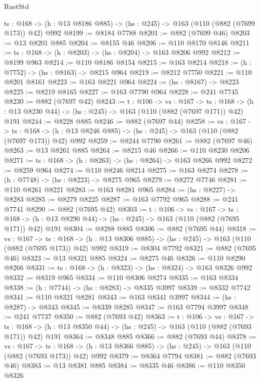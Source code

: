 \begin{lexlean}{RustStd}
\begin{coremodule}
  {ts : @168} -> (h : @13 @8186 @885) -> (hs : @245) -> @163 (@110 (@882 (@7699 @173)) @42) @992
@8199 := @8184 @7788
@8201 := @882 (@7699 @46)
@8203 := @13 @8201 @885
@8204 := @8155 @46
@8206 := @110 @8170 @8146
@8211 := {ts : @168} -> (h : @8203) -> (hs : @8204) -> @163 @8206 @992
@8212 := @8199 @963
@8214 := @110 @8186 @8154
@8215 := @163 @8214
@8218 := (h : @7752) -> (hs : @8163) -> @8215 @964
@8219 := @8212 @7750
@8221 := @110 @8201 @8161
@8223 := @163 @8221 @964
@8224 := (hs : @8167) -> @8223
@8225 := @8219 @8165
@8227 := @163 @7790 @964
@8228 := @241 @7745
@8230 := @882 (@7697 @42)
@8243 := {t : @106} ->
  {vs : @167} ->
  {ts : @168} -> (h : @13 @8230 @44) -> (hs : @245) -> @163 (@110 (@882 (@7697 @171)) @42) @191
@8244 := @8228 @885
@8246 := @882 (@7697 @44)
@8258 := {vs : @167} ->
  {ts : @168} -> (h : @13 @8246 @885) -> (hs : @245) -> @163 (@110 (@882 (@7697 @173)) @42) @992
@8259 := @8244 @7790
@8261 := @882 (@7697 @46)
@8263 := @13 @8261 @885
@8264 := @8215 @46
@8266 := @110 @8230 @8206
@8271 := {ts : @168} -> (h : @8263) -> (hs : @8264) -> @163 @8266 @992
@8272 := @8259 @964
@8274 := @110 @8246 @8214
@8275 := @163 @8274
@8278 := (h : @7748) -> (hs : @8223) -> @8275 @965
@8279 := @8272 @7746
@8281 := @110 @8261 @8221
@8283 := @163 @8281 @965
@8284 := (hs : @8227) -> @8283
@8285 := @8279 @8225
@8287 := @163 @7792 @965
@8288 := @241 @7741
@8290 := @882 (@7695 @42)
@8303 := {t : @106} ->
  {vs : @167} ->
  {ts : @168} -> (h : @13 @8290 @44) -> (hs : @245) -> @163 (@110 (@882 (@7695 @171)) @42) @191
@8304 := @8288 @885
@8306 := @882 (@7695 @44)
@8318 := {vs : @167} ->
  {ts : @168} -> (h : @13 @8306 @885) -> (hs : @245) -> @163 (@110 (@882 (@7695 @173)) @42) @992
@8319 := @8304 @7792
@8321 := @882 (@7695 @46)
@8323 := @13 @8321 @885
@8324 := @8275 @46
@8326 := @110 @8290 @8266
@8331 := {ts : @168} -> (h : @8323) -> (hs : @8324) -> @163 @8326 @992
@8332 := @8319 @965
@8334 := @110 @8306 @8274
@8335 := @163 @8334
@8338 := (h : @7744) -> (hs : @8283) -> @8335 @3997
@8339 := @8332 @7742
@8341 := @110 @8321 @8281
@8343 := @163 @8341 @3997
@8344 := (hs : @8287) -> @8343
@8345 := @8339 @8285
@8347 := @163 @7794 @3997
@8348 := @241 @7737
@8350 := @882 (@7693 @42)
@8363 := {t : @106} ->
  {vs : @167} ->
  {ts : @168} -> (h : @13 @8350 @44) -> (hs : @245) -> @163 (@110 (@882 (@7693 @171)) @42) @191
@8364 := @8348 @885
@8366 := @882 (@7693 @44)
@8378 := {vs : @167} ->
  {ts : @168} -> (h : @13 @8366 @885) -> (hs : @245) -> @163 (@110 (@882 (@7693 @173)) @42) @992
@8379 := @8364 @7794
@8381 := @882 (@7693 @46)
@8383 := @13 @8381 @885
@8384 := @8335 @46
@8386 := @110 @8350 @8326

\end{coremodule}
\end{lexlean}

